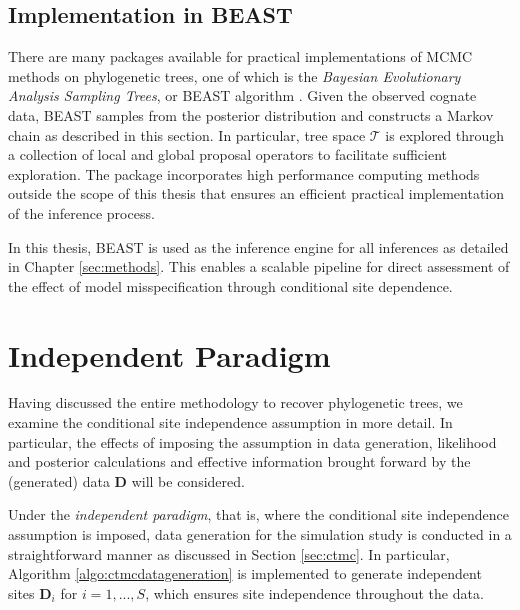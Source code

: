 \subsection{Implementation in BEAST}
\label{sec:beast}
There are many packages available for practical implementations of MCMC methods on phylogenetic trees, one of which is the \textit{Bayesian Evolutionary Analysis Sampling Trees}, or BEAST algorithm \cite{beast_documentation}. Given the observed cognate data, BEAST samples from the posterior distribution and constructs a Markov chain as described in this section. In particular, tree space $\mathcal{T}$ is explored through a collection of local and global proposal operators to facilitate sufficient exploration. The package incorporates high performance computing methods \cite{beagle_documentation} outside the scope of this thesis that ensures an efficient practical implementation of the inference process.

In this thesis, BEAST is used as the inference engine for all inferences as detailed in Chapter \ref{sec:methods}. This enables a scalable pipeline for direct assessment of the effect of model misspecification through conditional site dependence.

\section{Independent Paradigm}
\label{sec:independent}
Having discussed the entire methodology to recover phylogenetic trees, we examine the conditional site independence assumption in more detail. In particular, the effects of imposing the assumption in data generation, likelihood and posterior calculations and effective information brought forward by the (generated) data $\mathbf{D}$ will be considered. 

Under the \textit{independent paradigm}, that is, where the conditional site independence assumption is imposed, data generation for the simulation study is conducted in a straightforward manner as discussed in Section \ref{sec:ctmc}. In particular, Algorithm \ref{algo:ctmcdatageneration} is implemented to generate independent sites $\mathbf{D}_i$ for $i = 1, ..., S$, which ensures site independence throughout the data. 

